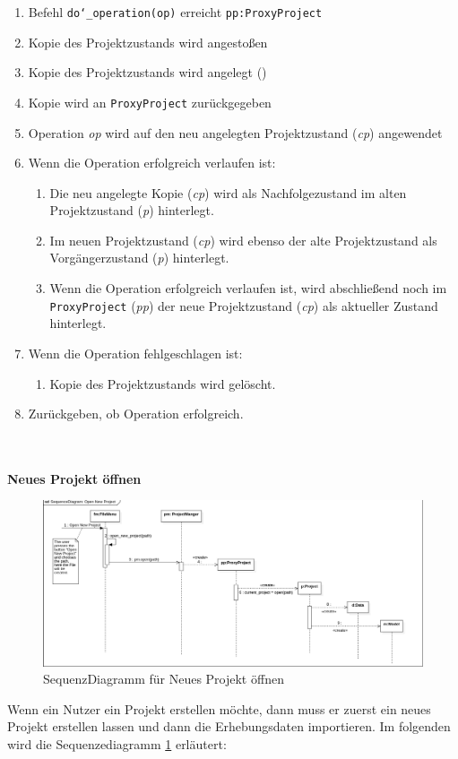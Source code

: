 \documentclass{article}
\begin{document}
\begin{itemize}
\begin{enumerate}
    \item[1.] Befehl \texttt{do\char`_operation(op)} erreicht \texttt{pp:ProxyProject}
    \item[2.] Kopie des Projektzustands wird angestoßen
    \item[3.] Kopie des Projektzustands wird angelegt ()
    \item[4.] Kopie wird an \texttt{ProxyProject} zurückgegeben
    \item[4.5.] Operation \emph{op} wird auf den neu angelegten Projektzustand (\emph{cp}) angewendet
    \item[] Wenn die Operation erfolgreich verlaufen ist:
    \begin{enumerate}
        \item[5.] Die neu angelegte Kopie (\emph{cp}) wird als Nachfolgezustand im alten Projektzustand (\emph{p}) hinterlegt.
        \item[7.] Im neuen Projektzustand (\emph{cp}) wird ebenso der alte Projektzustand als Vorgängerzustand (\emph{p}) hinterlegt.
        \item[9.] Wenn die Operation erfolgreich verlaufen ist, wird abschließend noch im \texttt{ProxyProject} (\emph{pp}) der neue Projektzustand (\emph{cp}) als aktueller Zustand hinterlegt.
    \end{enumerate}
    \item[] Wenn die Operation fehlgeschlagen ist:
    \begin{enumerate}
        \item[11.] Kopie des Projektzustands wird gelöscht.
    \end{enumerate}
    \item[12.] Zurückgeben, ob Operation erfolgreich.
    
\end{enumerate}
\\\\
\textbf{\large{Neues Projekt öffnen}}
\begin{figure}[H]%
    \includegraphics[width=15cm]{entwurf/Entwurf_dokument/img/Alissa/SQOpenNewProject3.png}
    \caption{SequenzDiagramm für Neues Projekt öffnen}
    \label{sq:opernNewProject}
\end{figure}
Wenn ein Nutzer ein Projekt erstellen möchte, dann muss er zuerst ein neues Projekt erstellen lassen und dann die Erhebungsdaten importieren. Im folgenden wird die Sequenzediagramm \ref{sq:opernNewProject} erläutert:


\end{itemize}
\end{document}
